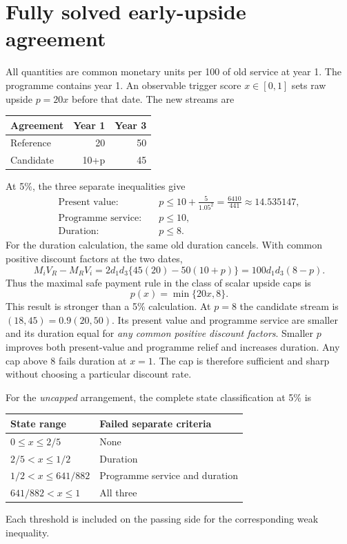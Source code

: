 \documentclass[11pt,a4paper]{article}
\begin{document}
\section{Fully solved early-upside agreement}\label{sec:examplecap}
All quantities are common monetary units per 100 of old service at year 1. The programme contains year 1. An observable trigger score $x\in[0,1]$ sets raw upside $p=20x$ before that date. The new streams are
\begin{center}
\begin{tabular}{lrr}\toprule
Agreement & Year 1 & Year 3\\\midrule
Reference &20&50\\
Candidate &10+p&45\\\bottomrule
\end{tabular}
\end{center}
At 5\%, the three separate inequalities give
\begin{align}
 \text{Present value:}\quad &p\leq10+\frac5{1.05^2}=\frac{6410}{441}\approx14.535147,\\
 \text{Programme service:}\quad &p\leq10,\\
 \text{Duration:}\quad &p\leq8.
\end{align}
For the duration calculation, the same old duration cancels. With common positive discount factors at the two dates,
\begin{equation}
 M_iV_R-M_RV_i
 =2d_1d_3\{45(20)-50(10+p)\}=100d_1d_3(8-p).
\end{equation}
Thus the maximal safe payment rule in the class of scalar upside caps is
\begin{equation}\boxed{\ p(x)=\min\{20x,8\}.\ }
\end{equation}
This result is stronger than a 5\% calculation. At $p=8$ the candidate stream is $(18,45)=0.9(20,50)$. Its present value and programme service are smaller and its duration equal for \emph{any common positive discount factors}. Smaller $p$ improves both present-value and programme relief and increases duration. Any cap above 8 fails duration at $x=1$. The cap is therefore sufficient and sharp without choosing a particular discount rate.

For the \emph{uncapped} arrangement, the complete state classification at 5\% is
\begin{center}
\begin{tabular}{ll}\toprule
State range & Failed separate criteria\\\midrule
$0\leq x\leq2/5$ & None\\
$2/5<x\leq1/2$ & Duration\\
$1/2<x\leq641/882$ & Programme service and duration\\
$641/882<x\leq1$ & All three\\\bottomrule
\end{tabular}
\end{center}
Each threshold is included on the passing side for the corresponding weak inequality.
\end{document}
